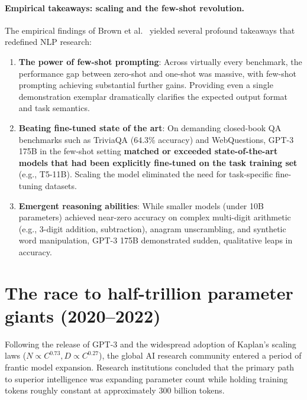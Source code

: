 \documentclass[../../main.tex]{subfiles}
\begin{document}
\paragraph{Empirical takeaways: scaling and the few-shot revolution.}
The empirical findings of Brown et al.~\cite{brown2020} yielded several profound takeaways that redefined NLP research:
\begin{enumerate}
    \item \textbf{The power of few-shot prompting}: Across virtually every benchmark, the performance gap between zero-shot and one-shot was massive, with few-shot prompting achieving substantial further gains. Providing even a single demonstration exemplar dramatically clarifies the expected output format and task semantics.
    \item \textbf{Beating fine-tuned state of the art}: On demanding closed-book QA benchmarks such as TriviaQA (64.3\% accuracy) and WebQuestions, GPT-3 175B in the few-shot setting \textbf{matched or exceeded state-of-the-art models that had been explicitly fine-tuned on the task training set} (e.g., T5-11B). Scaling the model eliminated the need for task-specific fine-tuning datasets.
    \item \textbf{Emergent reasoning abilities}: While smaller models (under 10B parameters) achieved near-zero accuracy on complex multi-digit arithmetic (e.g., 3-digit addition, subtraction), anagram unscrambling, and synthetic word manipulation, GPT-3 175B demonstrated sudden, qualitative leaps in accuracy.
\end{enumerate}


\section{The race to half-trillion parameter giants (2020--2022)}
\label{sec:race_to_scale}

Following the release of GPT-3 and the widespread adoption of Kaplan's scaling laws ($N \propto C^{0.73}, D \propto C^{0.27}$), the global AI research community entered a period of frantic model expansion. Research institutions concluded that the primary path to superior intelligence was expanding parameter count while holding training tokens roughly constant at approximately 300 billion tokens.
\end{document}
